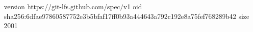 version https://git-lfs.github.com/spec/v1
oid sha256:6dfae97860587752e3b5bfaf17ff0b93a444643a792c192e8a75fef768289b42
size 2001
